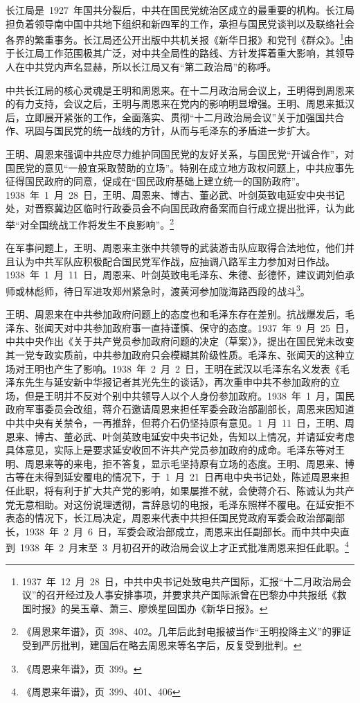 长江局是~1927~年国共分裂后，中共在国民党统治区成立的最重要的机构。长江局担负着领导南中国中共地下组织和新四军的工作，承担与国民党谈判以及联络社会各界的繁重事务。长江局还公开出版中共机关报《新华日报》和党刊《群众》。\footnote{1937~年~12~月~28~日，中共中央书记处致电共产国际，汇报“十二月政治局会议”的召开经过及人事安排事项，并要求共产国际派曾在巴黎办中共报纸《救国时报》的吴玉章、萧三、廖焕星回国办《新华日报》。}由于长江局工作范围极其广泛，对中共全局性的路线、方针发挥着重大影响，其领导人在中共党内声名显赫，所以长江局又有“第二政治局”的称呼。

中共长江局的核心灵魂是王明和周恩来。在十二月政治局会议上，王明得到周恩来的有力支持，会议之后，王明与周恩来在党内的影响明显增强。王明、周恩来抵汉后，立即展开紧张的工作，全面落实、贯彻“十二月政治局会议”关于加强国共合作、巩固与国民党的统一战线的方针，从而与毛泽东的矛盾进一步扩大。

王明、周恩来强调中共应尽力维护同国民党的友好关系，与国民党“开诚合作”，对国民党的意见“一般宜采取赞助的立场”。特别在成立地方政权问题上，中共应事先征得国民政府的同意，促成在“国民政府基础上建立统一的国防政府”。1938~年~1~月~28~日，王明、周恩来、博古、董必武、叶剑英致电延安中央书记处，对晋察冀边区临时行政委员会不向国民政府备案而自行成立提出批评，认为此举“对全国统战工作将发生不良影响”。\footnote{《周恩来年谱》，页~398、402。几年后此封电报被当作“王明投降主义”的罪证受到严厉批判，建国后在略去周恩来等名字后，反复受到批判。}

在军事问题上，王明、周恩来主张中共领导的武装游击队应取得合法地位，他们并且认为中共军队应积极配合国民党军作战，应抽调八路军主力参加对日作战。1938~年~1~月~11~日，周恩来、叶剑英致电毛泽东、朱德、彭德怀，建议调刘伯承师或林彪师，待日军进攻郑州紧急时，渡黄河参加陇海路西段的战斗\footnote{《周恩来年谱》，页~399。}。

王明、周恩来在中共参加政府问题上的态度也和毛泽东存在差别。抗战爆发后，毛泽东、张闻天对中共参加政府事一直持谨慎、保守的态度。1937~年~9~月~25~日，中共中央作出《关于共产党员参加政府问题的决定（草案）》，提出在国民党未改变其一党专政实质前，中共参加政府只会模糊其阶级性质。毛泽东、张闻天的这种立场对王明也产生了影响。1938~年~2~月~2~日，王明在武汉以毛泽东名义发表《毛泽东先生与延安新中华报记者其光先生的谈话》，再次重申中共不参加政府的立场，但是王明并不反对个别中共领导人以个人身份参加政府。1938~年~1~月，国民政府军事委员会改组，蒋介石邀请周恩来担任军委会政治部副部长，周恩来因知道中共中央有关禁令，一再推辞，但蒋介石仍坚持原有意见。1~月~11~日，王明、周恩来、博古、董必武、叶剑英致电延安中央书记处，告知以上情况，并请延安考虑具体意见，实际上是要求延安收回不许共产党员参加政府的成命。毛泽东等对王明、周恩来等的来电，拒不答复，显示毛坚持原有立场的态度。王明、周恩来、博古等在未得到延安覆电的情况下，于~1~月~21~日再电中央书记处，陈述周恩来担任此职，将有利于扩大共产党的影响，如果屡推不就，会使蒋介石、陈诚认为共产党无意相助。对这份说理透彻，言辞恳切的电报，毛泽东照样不覆电。在延安拒不表态的情况下，长江局决定，周恩来代表中共担任国民党政府军委会政治部副部长，1938~年~2~月~6~日，军委会政治部成立，周恩来出任副部长。而中共中央直到~1938~年~2~月末至~3~月初召开的政治局会议上才正式批准周恩来担任此职。\footnote{《周恩来年谱》，页~399、401、406}

